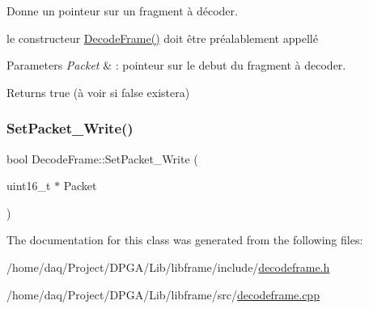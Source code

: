 Donne un pointeur sur un fragment à décoder. 

le constructeur \hyperlink{classDecodeFrame_ae6ae88ee29bcaff936e7c7b2380f96b4}{Decode\+Frame()} doit être préalablement appellé 
\begin{DoxyParams}{Parameters}
{\em Packet} & \+: pointeur sur le debut du fragment à decoder. \\
\hline
\end{DoxyParams}
\begin{DoxyReturn}{Returns}
true (à voir si false existera) 
\end{DoxyReturn}
\mbox{\label{classDecodeFrame_a82966f11399d4b9987c0718d9c2713b4}} 
\subsubsection{\texorpdfstring{Set\+Packet\+\_\+\+Write()}{SetPacket\_Write()}}
{\footnotesize\ttfamily bool Decode\+Frame\+::\+Set\+Packet\+\_\+\+Write (\begin{DoxyParamCaption}\item[{uint16\+\_\+t $\ast$}]{Packet }\end{DoxyParamCaption})}



The documentation for this class was generated from the following files\+:\begin{DoxyCompactItemize}
\item 
/home/daq/\+Project/\+D\+P\+G\+A/\+Lib/libframe/include/\hyperlink{decodeframe_8h}{decodeframe.\+h}\item 
/home/daq/\+Project/\+D\+P\+G\+A/\+Lib/libframe/src/\hyperlink{decodeframe_8cpp}{decodeframe.\+cpp}\end{DoxyCompactItemize}
